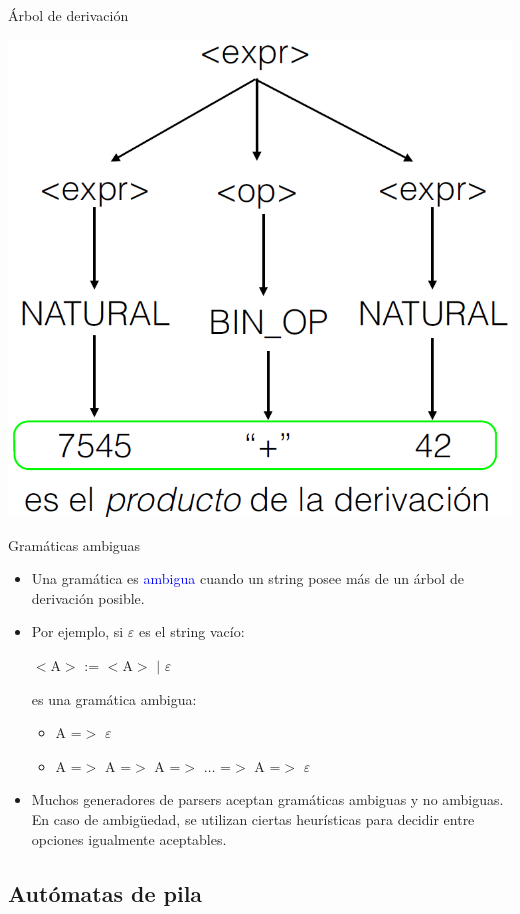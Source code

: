 \documentclass[handout]{beamer} %
\newcommand{\blue}[1]{\textcolor{blue}{#1}}
\begin{document}
\begin{frame}{Árbol de derivación}
    \begin{center}
    \includegraphics[width=.6\textwidth]{./image/cap2/arbol-derivacion}
    \end{center}
\end{frame}

\begin{frame}{Gramáticas ambiguas}
    \begin{itemize}
        \item<1-> Una gramática es \blue{ambigua} cuando un string posee más de un árbol de derivación posible.
        \item<2-> Por ejemplo, si $\varepsilon$ es el string vacío:
        \begin{center}$<$A$>$ := $<$A$>$ $\mid$ $\varepsilon$\end{center}
        es una gramática ambigua:
        \begin{itemize}
            \item A =$>$ $\varepsilon$
            \item A =$>$ A =$>$ A =$>$ $\ldots$ =$>$ A =$>$ $\varepsilon$
        \end{itemize}
        \item<3-> Muchos generadores de parsers aceptan gramáticas ambiguas y no ambiguas. En caso de ambigüedad, se utilizan ciertas heurísticas para decidir entre opciones igualmente aceptables.
    \end{itemize}
\end{frame}


\subsection{Autómatas de pila}
\end{document}
